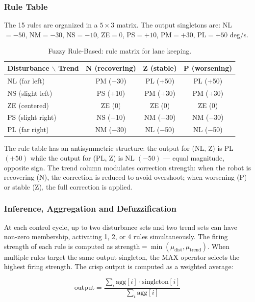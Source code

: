 \subsubsection{Rule Table}

The 15 rules are organized in a $5 \times 3$ matrix. The output singletons are: NL$=-50$, NM$=-30$, NS$=-10$, ZE$=0$, PS$=+10$, PM$=+30$, PL$=+50$ deg/s.

\begin{table}[htbp]
\centering
\caption{Fuzzy Rule-Based: rule matrix for lane keeping.}
\label{tab:rule-matrix}
\begin{tabular}{l|c|c|c}
\hline
\textbf{Disturbance $\backslash$ Trend} & \textbf{N (recovering)} & \textbf{Z (stable)} & \textbf{P (worsening)} \\
\hline
NL (far left)      & PM (+30) & PL (+50) & PL (+50) \\
NS (slight left)   & PS (+10) & PM (+30) & PM (+30) \\
ZE (centered)      & ZE (0)   & ZE (0)   & ZE (0) \\
PS (slight right)  & NS ($-$10)  & NM ($-$30) & NM ($-$30) \\
PL (far right)     & NM ($-$30)  & NL ($-$50) & NL ($-$50) \\
\hline
\end{tabular}
\end{table}

The rule table has an antisymmetric structure: the output for (NL, Z) is PL $(+50)$ while the output for (PL, Z) is NL $(-50)$ — equal magnitude, opposite sign. The trend column modulates correction strength: when the robot is recovering (N), the correction is reduced to avoid overshoot; when worsening (P) or stable (Z), the full correction is applied.

\subsubsection{Inference, Aggregation and Defuzzification}

At each control cycle, up to two disturbance sets and two trend sets can have non-zero membership, activating 1, 2, or 4 rules simultaneously. The firing strength of each rule is computed as $\text{strength} = \min(\mu_{\text{dist}}, \mu_{\text{trend}})$. When multiple rules target the same output singleton, the MAX operator selects the highest firing strength. The crisp output is computed as a weighted average:

\begin{equation}
    \text{output} = \frac{\sum_i \text{agg}[i] \cdot \text{singleton}[i]}{\sum_i \text{agg}[i]}
    \label{eq:defuzz}
\end{equation}


